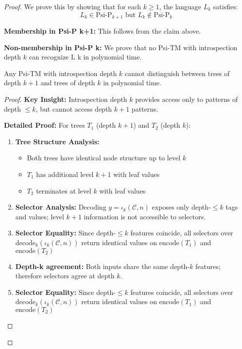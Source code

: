 \begin{proof}
We prove this by showing that for each $k \geq 1$, the language $L_k$ satisfies:
$$L_k \in \text{Psi-P}_{k+1} \text{ but } L_k \notin \text{Psi-P}_k$$

\textbf{Membership in Psi-P k+1:}
This follows from the claim above.

\textbf{Non-membership in Psi-P k:}
We prove that no Psi-TM with introspection depth $k$ can recognize L k in polynomial time.

\begin{lemma}
\label{lem:depth-k-limitation-2}
Any Psi-TM with introspection depth $k$ cannot distinguish between trees of depth $k+1$ and trees of depth $k$ in polynomial time.
\end{lemma}

\begin{proof}
\textbf{Key Insight:} Introspection depth $k$ provides access only to patterns of depth $\leq k$, but cannot access depth $k+1$ patterns.

\textbf{Detailed Proof:}
For trees $T_1$ (depth $k+1$) and $T_2$ (depth $k$):

\begin{enumerate}
\item \textbf{Tree Structure Analysis:}
  \begin{itemize}
  \item Both trees have identical node structure up to level $k$
  \item $T_1$ has additional level $k+1$ with leaf values
  \item $T_2$ terminates at level $k$ with leaf values
  \end{itemize}

\item \textbf{Selector Analysis:}
  Decoding $y=\iota_k(\mathcal{C},n)$ exposes only depth-$\le k$ tags and values; level $k{+}1$ information is not accessible to selectors.

\item \textbf{Selector Equality:}
  Since depth-$\le k$ features coincide, all selectors over $\mathrm{decode}_k(\iota_k(\mathcal{C},n))$ return identical values on $\text{encode}(T_1)$ and $\text{encode}(T_2)$

\item \textbf{Depth-k agreement:}
  Both inputs share the same depth-$k$ features; therefore selectors agree at depth $k$.

\item \textbf{Selector Equality:}
  Since depth-$\le k$ features coincide, all selectors over $\mathrm{decode}_k(\iota_k(\mathcal{C},n))$ return identical values on $\text{encode}(T_1)$ and $\text{encode}(T_2)$


\end{enumerate}
\end{proof}
\end{proof}
